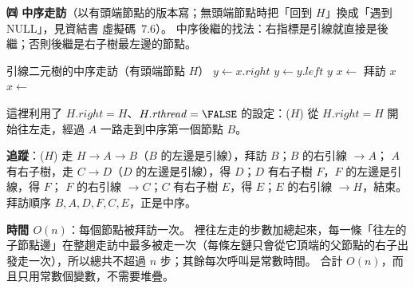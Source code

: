 \begin{pastsoln}
\textbf{㈣ 中序走訪}（以有頭端節點的版本寫；無頭端節點時把「回到 $H$」換成「遇到 NULL」，見資結書
虛擬碼~7.6）。 中序後繼的找法：右指標是引線就直接是後繼；否則後繼是右子樹最左邊的節點。
\begin{pseudo}{引線二元樹的中序走訪（有頭端節點 $H$）}
    \State $y \gets x.\mathit{right}$
     
            \State $y \gets y.\mathit{left}$
        \EndWhile
    \EndIf
    \State \Return $y$
\EndFunction
{}
    \State $x \gets$  
        \State 拜訪 $x$
        \State $x \gets$ 
    \EndWhile
\EndProcedure
\end{pseudo}
這裡利用了 $H.\mathit{right} = H$、$H.\mathit{rthread} = \FALSE$ 的設定：($H$) 從
$H.\mathit{right} = H$ 開始往左走，經過 $A$ 一路走到中序第一個節點 $B$。

\textbf{追蹤}：($H$) 走 $H \to A \to B$（$B$ 的左邊是引線），拜訪 $B$；$B$ 的右引線 $\to A$；
$A$ 有右子樹，走 $C \to D$（$D$ 的左邊是引線），得 $D$；$D$ 有右子樹 $F$，$F$ 的左邊是引線，得 $F$；
$F$ 的右引線 $\to C$；$C$ 有右子樹 $E$，得 $E$；$E$ 的右引線 $\to H$，結束。 拜訪順序
$B, A, D, F, C, E$，正是中序。

\textbf{時間 $O(n)$}：每個節點被拜訪一次。  裡往左走的步數加總起來，每一條「往左的
子節點邊」在整趟走訪中最多被走一次（每條左鏈只會從它頂端的父節點的右子出發走一次），所以總共不超過
$n$ 步；其餘每次呼叫是常數時間。 合計 $O(n)$，而且只用常數個變數，不需要堆疊。
\end{pastsoln}
